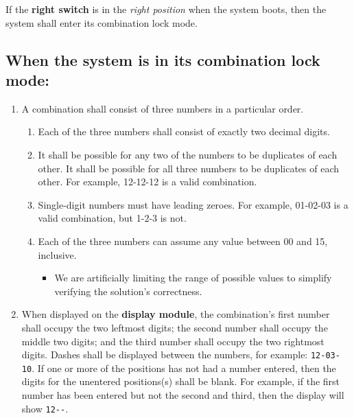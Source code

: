 \setcounter{myenumcounter}{\value{enumi}}

If the \textbf{right switch} is in the \textit{right position} when the system boots, then the system shall enter its combination lock mode.

\subsection*{When the system is in its combination lock mode:}

\begin{enumerate}[start=\value{enumi}]
    \setcounter{enumi}{\value{myenumcounter}}
    \item \label{spec:combinationDefined} A combination shall consist of three numbers in a particular order.
        \begin{enumerate}
            \item Each of the three numbers shall consist of exactly two decimal digits.
            \item It shall be possible for any two of the numbers to be duplicates of each other.
                It shall be possible for all three numbers to be duplicates of each other.
                For example, 12-12-12 is a valid combination.
            \item Single-digit numbers must have leading zeroes.
                For example, 01-02-03 is a valid combination, but 1-2-3 is not.
            \item Each of the three numbers can assume any value between 00 and 15, inclusive.
                \begin{itemize}
                    \item We are artificially limiting the range of possible values to simplify verifying the solution's correctness.
                \end{itemize}
        \end{enumerate}
    \item When displayed on the \textbf{display module}, the combination's first number shall occupy the two leftmost digits;
        the second number shall occupy the middle two digits;
        and the third number shall occupy the two rightmost digits.
        Dashes shall be displayed between the numbers, for example: \texttt{12-03-10}.
        If one or more of the positions has not had a number entered, then the digits for the unentered positions(s) shall be blank.
        For example, if the first number has been entered but not the second and third, then the display will show \texttt{12-\phantom{88}-\phantom{88}}.

\end{enumerate}
